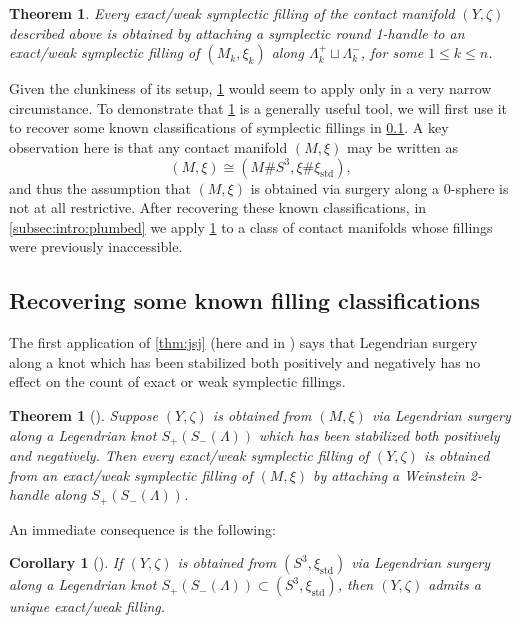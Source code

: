 \documentclass[11pt]{amsart}
\numberwithin{equation}{section}
\theoremstyle{plain}
\newtheorem{thm}[equation]{Theorem}%
\newtheorem{cor}[equation]{Corollary}%
\theoremstyle{definition}
\theoremstyle{remark}\newtheorem{rem}[equation]{Remark}%
\theoremstyle{remark}\newtheorem{obs}[equation]{Observation}%
\begin{document}
\begin{thm}\label{thm:fillings-of-round-surgery}
Every exact/weak symplectic filling of the contact manifold $(Y,\zeta)$ described above is obtained by attaching a symplectic round 1-handle to an exact/weak symplectic filling of $(M_k,\xi_k)$ along $\Lambda_k^+\sqcup\Lambda_k^-$, for some $1\leq k\leq n$.
\end{thm}

Given the clunkiness of its setup, \cref{thm:fillings-of-round-surgery} would seem to apply only in a very narrow circumstance.  To demonstrate that \cref{thm:fillings-of-round-surgery} is a generally useful tool, we will first use it to recover some known classifications of symplectic fillings in \cref{subsec:intro:known-results}.  A key observation here is that any contact manifold $(M,\xi)$ may be written as
\[
(M,\xi) \cong (M\#S^3,\xi\#\xi_{\mathrm{std}}),
\]
and thus the assumption that $(M,\xi)$ is obtained via surgery along a 0-sphere is not at all restrictive.  After recovering these known classifications, in \cref{subsec:intro:plumbed} we apply \cref{thm:fillings-of-round-surgery} to a class of contact manifolds whose fillings were previously inaccessible.

\subsection{Recovering some known filling classifications}\label{subsec:intro:known-results}

The first application of \cref{thm:jsj} (here and in \cite{christian2018jsj}) says that Legendrian surgery along a knot which has been stabilized both positively and negatively has no effect on the count of exact or weak symplectic fillings.

\begin{thm}[{\cite[Theorem 1.4]{christian2018jsj}}]\label{thm:mixed-stabilizations}
Suppose $(Y,\zeta)$ is obtained from $(M,\xi)$ via Legendrian surgery along a Legendrian knot $S_+(S_-(\Lambda))$ which has been stabilized both positively and negatively.  Then every exact/weak symplectic filling of $(Y,\zeta)$ is obtained from an exact/weak symplectic filling of $(M,\xi)$ by attaching a Weinstein 2-handle along $S_+(S_-(\Lambda))$.
\end{thm}

An immediate consequence is the following:

\begin{cor}[{\cite[Corollary 1.5]{christian2018jsj}}]\label{cor:mixed-stabilizations-unique-fillings}
If $(Y,\zeta)$ is obtained from $(S^3,\xi_{\mathrm{std}})$ via Legendrian surgery along a Legendrian knot $S_+(S_-(\Lambda))\subset(S^3,\xi_{\mathrm{std}})$, then $(Y,\zeta)$ admits a unique exact/weak filling.
\end{cor}
\end{document}
